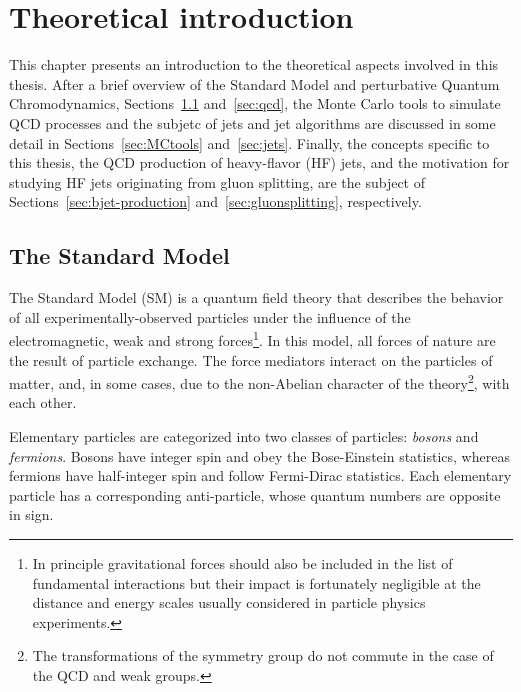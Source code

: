 %
%
\chapter{Theoretical introduction}\label{ch:theory}

This chapter presents an introduction to the theoretical aspects involved in this thesis. After a 
brief overview of the Standard Model and perturbative Quantum Chromodynamics, Sections~\ref{sec:qcdintro} and~\ref{sec:qcd}, the Monte Carlo tools to simulate QCD processes and the subjetc of jets and jet algorithms are discussed in some detail in Sections~\ref{sec:MCtools} and~\ref{sec:jets}. Finally, the concepts specific to this thesis, the QCD production of heavy-flavor (HF) jets, and the motivation for studying HF jets originating from gluon splitting, are the subject of Sections~\ref{sec:bjet-production} and~\ref{sec:gluonsplitting}, respectively.

\section{The Standard Model}\label{sec:qcdintro}

The Standard Model (SM) is a quantum field theory that describes the behavior of all experimentally-observed particles under the influence of the electromagnetic, weak and strong forces\footnote{In principle gravitational forces should also be included in the list of fundamental interactions but their impact is  fortunately negligible at the distance and energy scales usually considered in particle physics experiments.}. In this model, all forces of nature are the result of particle exchange. The force mediators interact on the particles of matter, and, in some cases, due to the non-Abelian character of the theory\footnote{The transformations of the symmetry group do not commute in the case of the QCD and weak groups.}, with each other.

Elementary particles are categorized into two classes of particles: \emph{bosons} and \emph{fermions}. Bosons have integer spin and obey the Bose-Einstein statistics, whereas fermions have half-integer spin and follow Fermi-Dirac statistics.  Each elementary particle has a corresponding anti-particle, whose quantum numbers are opposite in sign.

